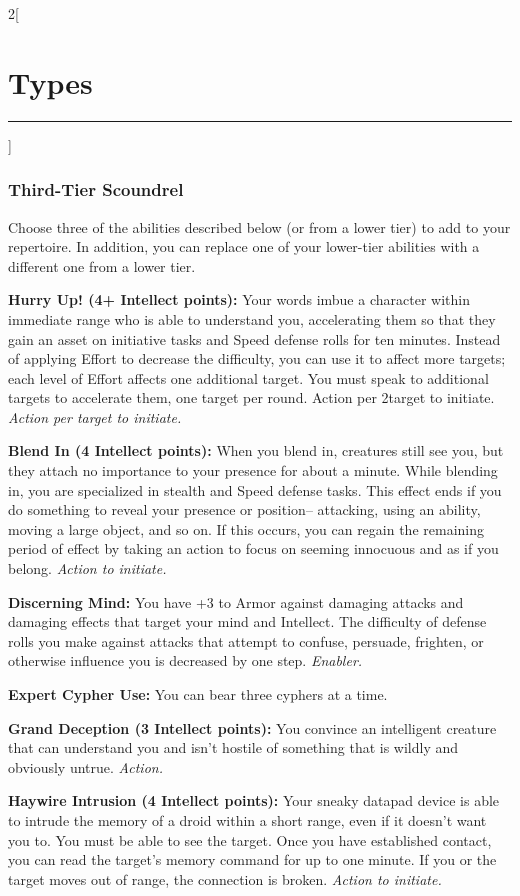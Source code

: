 \documentclass[a4paper,10pt,final]{book}
\newcommand{\HRule}{\rule{\linewidth}{0.5mm}} %
\newcommand{\newSection}[1]{\section*{#1} \addcontentsline{toc}{section}{#1} \label{sec:#1} \HRule}
\newcommand{\itemAbility}[2]{\textcolor{25gray}{\textbullet\textbf{ #1:}} {#2}\par}
\newcommand{\enabler}{\textit{ Enabler.}}
\newcommand{\action}{\textit{ Action.}}
\newcommand{\actionInit}{\textit{ Action to initiate.}}
\newcommand{\actionInitTarget}{\textit{ Action per target to initiate.}}
\newenvironment{docsection}[1]
{
  \begin{multicols*}{2}[\newSection{#1}]
}
{
  \end{multicols*}
  \newpage
}
\begin{document}
\begin{docsection}{Types}

\subsubsection*{Third-Tier Scoundrel}
\label{subsub:scoundrelThirdTier}

Choose three of the abilities described
below (or from a lower tier) to add to your
repertoire. In addition, you can replace one
of your lower-tier abilities with a different
one from a lower tier.\par

\itemAbility{Hurry Up! (4+ Intellect points)}{Your
words imbue a character within
immediate range who is able to understand
you, accelerating them so that they gain an
asset on initiative tasks and Speed defense
rolls for ten minutes. Instead of applying Effort to decrease the difficulty, you can use
it to affect more targets; each level of Effort
affects one additional target. You must
speak to additional targets to accelerate
them, one target per round. Action per
2target to initiate.\actionInitTarget}

\itemAbility{Blend In (4 Intellect points)}{When you
blend in, creatures still see you, but they
attach no importance to your presence for
about a minute. While blending in, you are
specialized in stealth and Speed defense
tasks. This effect ends if you do something
to reveal your presence or position--
attacking, using an ability, moving a large
object, and so on. If this occurs, you can
regain the remaining period of effect by
taking an action to focus on seeming
innocuous and as if you belong.\actionInit}

\itemAbility{Discerning Mind}{You have +3 to Armor
against damaging attacks and damaging
effects that target your mind and Intellect.
The difficulty of defense rolls you make
against attacks that attempt to confuse,
persuade, frighten, or otherwise influence
you is decreased by one step.\enabler}

\itemAbility{Expert Cypher Use}{You can bear three
cyphers at a time.}

\itemAbility{Grand Deception (3 Intellect points)}{You convince an intelligent creature that
can understand you and isn’t hostile of
something that is wildly and obviously
untrue.\action}

\itemAbility{Haywire Intrusion (4 Intellect points)}{
Your sneaky datapad device is able to intrude the memory of a droid
within a short range, even if it doesn’t want
you to. You must be able to see the target.
Once you have established contact, you
can read the target’s memory command for up to one
minute. If you or the target moves out of
range, the connection is broken.\actionInit}


\end{docsection}
\end{document}
